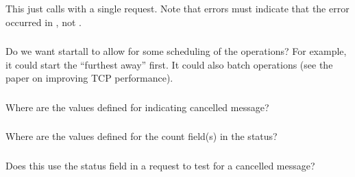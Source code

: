 \documentclass{article}
\begin{document}
\subsubsection{}
This just calls  with a single request.  Note that
errors must indicate that the error occurred in , not
.  

\subsubsection{}
Do we want startall to allow for some scheduling of the operations?  For
example, it could start the ``furthest away'' first.  It could also batch
operations (see the paper on improving TCP performance).

\subsubsection{}
Where are the values defined for indicating cancelled message?

\subsubsection{}
Where are the values defined for the count field(s) in the status?

\subsubsection{}
\subsubsection{}
\subsubsection{}
\subsubsection{}

\subsubsection{}
Does this use the status field in a request to test for a cancelled message?
\end{document}
